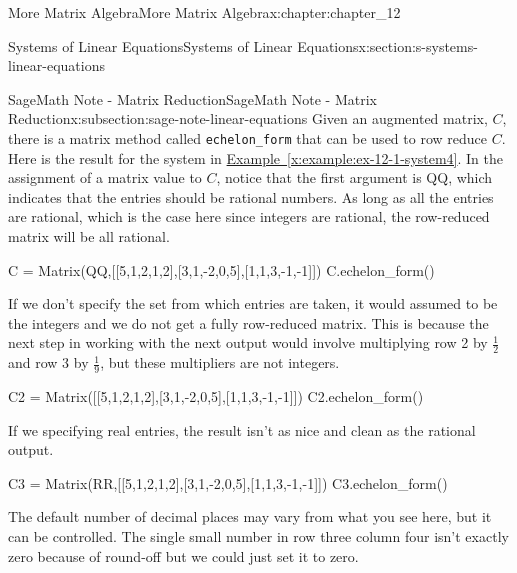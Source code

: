 \documentclass[oneside,10pt,]{book}
\newcommand{\xreffont}{\relax}
\newcommand{\mono}[1]{\texttt{#1}}
\numberwithin{equation}{section}
\begin{document}
\begin{chapterptx}{More Matrix Algebra}{}{More Matrix Algebra}{}{}{x:chapter:chapter_12}
\begin{sectionptx}{Systems of Linear Equations}{}{Systems of Linear Equations}{}{}{x:section:s-systems-linear-equations}
\begin{subsectionptx}{SageMath Note - Matrix Reduction}{}{SageMath Note - Matrix Reduction}{}{}{x:subsection:sage-note-linear-equations}
Given an augmented matrix, \(C\), there is a matrix method called \mono{echelon\_form} that can be used to row reduce \(C\). Here is the result for the system in \hyperref[x:example:ex-12-1-system4]{Example~{\xreffont\ref{x:example:ex-12-1-system4}}}.  In the assignment of a matrix value to \(C\), notice that the first argument is QQ, which indicates that the entries should be rational numbers.  As long as all the entries are rational, which is the case here since integers are rational, the row-reduced matrix will be all rational.%
\begin{sageinput}
C = Matrix(QQ,[[5,1,2,1,2],[3,1,-2,0,5],[1,1,3,-1,-1]])
C.echelon_form()
\end{sageinput}
\begin{sageoutput}
[1 	0 	0 	1/2 	1/2]
[0 	1 	0	-3/2 	3/2]
[0 	0 	1 	  0	-1]
\end{sageoutput}
If we don't specify the set from which entries are taken, it would assumed to be the integers and we do not get a fully row-reduced matrix. This is because the next step in working with the next output would involve multiplying row 2 by \(\frac{1}{2}\) and row 3 by \(\frac{1}{9}\), but these multipliers are not integers.%
\begin{sageinput}
C2 = Matrix([[5,1,2,1,2],[3,1,-2,0,5],[1,1,3,-1,-1]])
C2.echelon_form()
\end{sageinput}
\begin{sageoutput}
[ 1  1  3 -1 -1]
[ 0  2  2 -3  1]
[ 0  0  9  0 -9]
\end{sageoutput}
If we specifying real entries, the result isn't as nice and clean as the rational output.%
\begin{sageinput}
C3 = Matrix(RR,[[5,1,2,1,2],[3,1,-2,0,5],[1,1,3,-1,-1]])
C3.echelon_form()
\end{sageinput}
\begin{sageoutput}
[    1.000000    0.0000000    0.0000000    0.5000000    0.500000000000000]
[   0.0000000     1.000000    0.0000000    -1.500000     1.50000000000000]
[   0.0000000    0.0000000     1.000000   4.934324e-17  -1.00000000000000]
\end{sageoutput}
The default number of decimal places may vary from what you see here, but it can be controlled. The single small number in row three column four isn't exactly zero because of round-off but we could just set it to zero.%
\end{subsectionptx}
%
%
\typeout{************************************************}
\typeout{************************************************}

\end{sectionptx}
\end{chapterptx}
\end{document}
